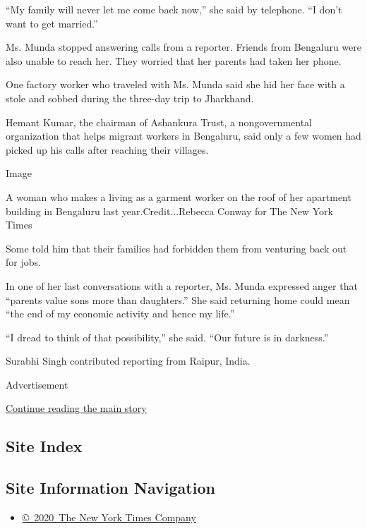 ``My family will never let me come back now,'' she said by telephone.
``I don't want to get married.''

Ms. Munda stopped answering calls from a reporter. Friends from
Bengaluru were also unable to reach her. They worried that her parents
had taken her phone.

One factory worker who traveled with Ms. Munda said she hid her face
with a stole and sobbed during the three-day trip to Jharkhand.

Hemant Kumar, the chairman of Ashankura Trust, a nongovernmental
organization that helps migrant workers in Bengaluru, said only a few
women had picked up his calls after reaching their villages.

Image

A woman who makes a living as a garment worker on the roof of her
apartment building in Bengaluru last year.Credit...Rebecca Conway for
The New York Times

Some told him that their families had forbidden them from venturing back
out for jobs.

In one of her last conversations with a reporter, Ms. Munda expressed
anger that ``parents value sons more than daughters.'' She said
returning home could mean ``the end of my economic activity and hence my
life.''

``I dread to think of that possibility,'' she said. ``Our future is in
darkness.''

Surabhi Singh contributed reporting from Raipur, India.

Advertisement

\protect\hyperlink{after-bottom}{Continue reading the main story}

\hypertarget{site-index}{%
\subsection{Site Index}\label{site-index}}

\hypertarget{site-information-navigation}{%
\subsection{Site Information
Navigation}\label{site-information-navigation}}

\begin{itemize}
\tightlist
\item
  \href{https://help.nytimes.com/hc/en-us/articles/115014792127-Copyright-notice}{©~2020~The
  New York Times Company}
\end{itemize}

